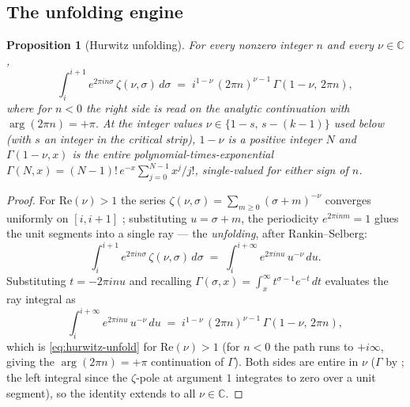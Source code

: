 \documentclass[11pt]{article}
\newtheorem{proposition}[theorem]{Proposition}
\numberwithin{equation}{section}  %
\newcommand{\CC}{\mathbb{C}}
\begin{document}
\subsection{The unfolding engine}\label{subsec:hurwitz-unfold}

\begin{proposition}[Hurwitz unfolding]\label{prop:hurwitz-unfold}
For every nonzero integer $n$ and every $\nu \in \CC$,
\begin{equation}\label{eq:hurwitz-unfold}
  \int_i^{i+1}\! e^{2\pi i n \sigma}\,\zeta(\nu, \sigma)\,d\sigma
  \;=\; i^{1 - \nu}\,(2\pi n)^{\nu - 1}\,\Gamma(1 - \nu,\, 2\pi n),
\end{equation}
where for $n < 0$ the right side is read on the analytic continuation
with $\arg(2\pi n) = +\pi$.  At the integer values
$\nu \in \{1 - s,\, s - (k-1)\}$ used below (with $s$ an integer in the
critical strip), $1 - \nu$ is a positive integer $N$ and
$\Gamma(1 - \nu, x)$ is the entire polynomial-times-exponential
$\Gamma(N, x) = (N-1)!\,e^{-x}\sum_{j=0}^{N-1} x^j/j!$, single-valued for
either sign of $n$.
\end{proposition}
\begin{proof}
For $\mathrm{Re}(\nu) > 1$ the series
$\zeta(\nu, \sigma) = \sum_{m \ge 0}(\sigma + m)^{-\nu}$ converges
uniformly on $[i, i+1]$ \cite[\S25.11]{DLMF}; substituting
$u = \sigma + m$, the periodicity $e^{2\pi i n m} = 1$ glues the unit
segments into a single ray --- the \emph{unfolding}, after
Rankin--Selberg:
\begin{equation}
  \int_i^{i+1}\! e^{2\pi i n \sigma}\,\zeta(\nu, \sigma)\,d\sigma
  \;=\; \int_i^{i+\infty}\! e^{2\pi i n u}\,u^{-\nu}\,du.
\end{equation}
Substituting $t = -2\pi i n u$ and recalling
$\Gamma(\sigma, x) = \int_x^\infty t^{\sigma - 1}e^{-t}\,dt$
\cite[\S8.2.2]{DLMF} evaluates the ray integral as
\begin{equation}
  \int_i^{i+\infty}\! e^{2\pi i n u}\,u^{-\nu}\,du
  \;=\; i^{1 - \nu}\,(2\pi n)^{\nu - 1}\,\Gamma(1 - \nu,\, 2\pi n),
\end{equation}
which is \eqref{eq:hurwitz-unfold} for $\mathrm{Re}(\nu) > 1$ (for
$n < 0$ the path runs to $+i\infty$, giving the $\arg(2\pi n) = +\pi$
continuation of $\Gamma$).  Both sides are entire in $\nu$
($\Gamma$ by \cite[\S8.2.7]{DLMF}; the left integral since the
$\zeta$-pole at argument $1$ integrates to zero over a unit segment),
so the identity extends to all $\nu \in \CC$.
\end{proof}
\end{document}

